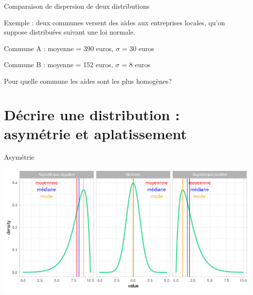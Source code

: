 \documentclass{beamer}
\begin{document}
\begin{frame}{Comparaison de dispersion de deux distributions}



Exemple : deux communes  versent des aides aux entreprises locales, qu'on suppose distribuées suivant une loi normale. 

Commune A :  moyenne = 390 euros, $\sigma$ = 30 euros 

Commune B :  moyenne = 152 euros, $\sigma$ = 8 euros

\vspace{1cm}

Pour quelle commune les aides sont les plus homogènes?



\end{frame}





\section{Décrire une distribution : \alert{asymétrie} et \alert{aplatissement}} 



\begin{frame}{Asymétrie}



\centering
\includegraphics[width=\linewidth]{img/asymetrie.png}



\end{frame}

\end{document}
